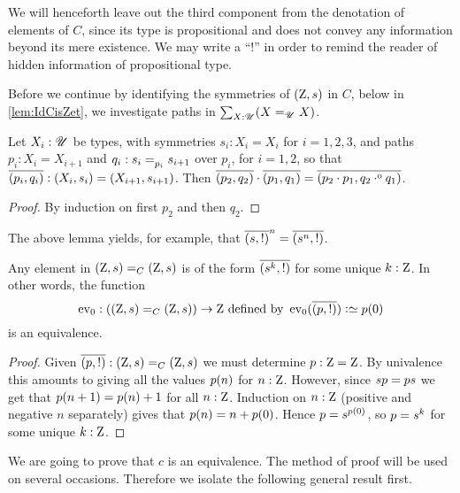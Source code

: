 We will henceforth leave out the third component from the denotation
of elements of $C$, since its type is propositional and does not convey 
any information beyond its mere existence. We may write a ``!'' in order
to remind the reader of hidden information of propositional type.

Before we continue by identifying the symmetries of $(\mathrm{Z},{s})$
in $C$, below in \cref{lem:IdCisZet}, we investigate paths in
$\sum_{X:{\mathscr{U}}}(X=_{{\mathscr{U}}}X)$.%
%
\begin{lemma}\label{lem:path-in-sum-X:U-X=X}
Let $X_i:{\mathscr{U}}$ be types, with symmetries $s_i: X_i = X_i$ for $i=1,2,3$, and 
paths $p_i : X_i = X_{i+1}$ and $q_i : \pathover {s_i}{}{p_i}{s_{i+1}}$ over $p_i$, 
for $i=1,2$, so that $\overline{({p_i},{q_i})} : (X_i,s_i) = (X_{i+1},s_{i+1})$.
Then $\overline{({p_2},{q_2})} \cdot \overline{({p_1},{q_1})} = \overline{({p_2 \cdot p_1},{q_2 \cdot^{\mathrm{o}} q_1})} $.
\end{lemma}
\begin{proof}
By induction on first $p_2$ and then $q_2$.
\end{proof}

The above lemma yields, for example, that $\overline{({{s}},{!})} ^n = \overline{({{s}^n},{!})}$.

\begin{lemma}
  \label{lem:IdCisZet}
Any element in $(\mathrm{Z},{s})=_C(\mathrm{Z},{s})$ is of 
the form $\overline{({{s}^k},{!})}$ for some unique $k:\mathrm{Z}$.  
In other words, the function 
\[
\ev_0:((\zet,\etop{s})=_C(\zet,\etop{s}))\to \zet 
\text{~defined by~} \ev_0(\pathpair{p}{!}) \defeq \ptoe{p}(0)
\]
is an equivalence.
\end{lemma}
\begin{proof}
  Given $\overline{({p},{!})}:(\mathrm{Z},{s})=_C(\mathrm{Z},{s})$ we must determine 
$p:\mathrm{Z}=\mathrm{Z}$. By univalence this amounts to giving all the values 
${p}(n)$ for $n:\mathrm{Z}$.  However, since $s{p}={p}s$ we 
get that ${p}(n+1)={p}(n)+1$ for all $n:\mathrm{Z}$. 
Induction on $n:\mathrm{Z}$ (positive and negative $n$ separately) gives that 
${p}(n)=n+{p}(0)$. Hence ${p}=s^{{p}(0)}$, so $p={s}^k$
for some unique $k:\mathrm{Z}$.
\end{proof}

We are going to prove that $c$ is an equivalence.
The method of proof will be used on several occasions.
Therefore we isolate the following general result first.

